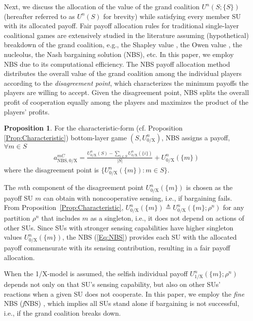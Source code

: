 \documentclass[journal,draftclsnofoot,onecolumn]{IEEEtran}
\theoremstyle{definition}
\newtheorem{Prop}{Proposition}
\begin{document}
Next, we discuss the allocation of the value of the grand coalition $U^n(S;\{S\})$ (hereafter referred to as $U^n(S)$ for brevity) while satisfying every member SU with its allocated payoff. Fair payoff allocation rules for traditional single-layer coalitional games are extensively studied in the literature assuming (hypothetical) breakdown of the grand coalition, e.g., the Shapley value \cite{CoalGameSurvey}, the Owen value \cite{Owen}, the nucleolus\cite{CoalGameSurvey}, the Nash bargaining solution (NBS)\cite{NBS,NBSNeg}, etc. In this paper, we employ NBS due to its computational efficiency\cite{NBS}. The NBS payoff allocation method distributes the overall value of the grand coalition among the individual players according to the \emph{disagreement point}, which characterizes the minimum payoffs the players are willing to accept. Given the disagreement point, NBS splits the overall profit of cooperation equally among the players and maximizes the product of the players' profits\cite{NBS}.


\begin{Prop}\label{Prop:NBS}	For the characteristic-form (cf. Proposition \ref{Prop:Characteristic}) bottom-layer game $(S,U_\mathrm{0/X}^n)$, NBS assigns a payoff, $\forall m\in S$ \cite{NBS,NBSNeg}
\begin{equation}\label{Eq:NBS}
\begin{split}
a^{mC}_\mathrm{NBS,0/X}=\frac{U_\mathrm{0/X}^n(S)-\sum\limits_{i\in S}U_\mathrm{0/X}^n(\{i\})}{|S|}+ U_\mathrm{0/X}^n(\{m\})
\end{split}
\end{equation}
where the disagreement point is $\big\{U_\mathrm{0/X}^n(\{m\}):m\in S \big\}$.
\end{Prop}
\noindent The $m$th component of the disagreement point $U_\mathrm{0/X}^n(\{m\})$ is chosen as the payoff SU $m$ can obtain with noncooperative sensing, i.e., if bargaining fails. From Proposition~\ref{Prop:Characteristic}, $U_\mathrm{0/X}^n(\{m\})\triangleq U_\mathrm{0/X}^n(\{m\};\rho^n)$ for any partition $\rho^n$ that includes $m$ as a singleton, i.e., it does not depend on actions of other SUs. Since SUs with stronger sensing capabilities have higher singleton values $U_\mathrm{0/X}^n(\{m\})$, the NBS (\ref{Eq:NBS}) provides each SU with the allocated payoff commensurate with its sensing contribution, resulting in a fair payoff allocation.

When the 1/X-model is assumed, the selfish individual payoff $U_\mathrm{1/X}^n(\{m\};\rho^n)$ depends not only on that SU's sensing capability, but also on other SUs' reactions when a given SU does not cooperate. In this paper, we employ the \textit{fine} NBS (\textit{f}NBS) \cite{NBSNeg}, which implies all SUs stand alone if bargaining is not successful, i.e., if the grand coalition breaks down.
\end{document}
